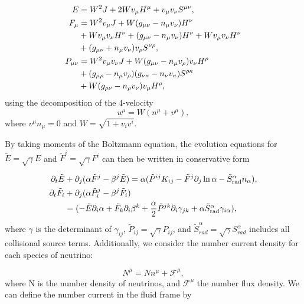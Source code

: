 \begin{align}
  E &= W^2 J + 2 W v_\mu H^\mu + v_\mu v_\nu S^{\mu\nu}, \\
  F_\mu &= W^2 v_\mu J + W(g_{\mu\nu} - n_\mu v_\nu) H^\nu \\
  &+ W v_\mu v_\nu H^\nu + (g_{\mu\nu} - n_\mu v_\nu) H^\nu + Wv_\mu v_\nu H^\nu \notag\\
  &+ (g_{\mu\nu} + n_\mu v_\nu) v_\rho S^{\nu\rho}, \notag\\
  P_{\mu\nu} &= W^2 v_\mu v_\nu J + W(g_{\mu\nu} - n_\mu v_\rho)v_\nu H^\rho \\
  &+ (g_{\mu\rho} - n_\mu v_\rho)(g_{\nu\kappa} - n_\nu v_\kappa)S^{\rho\kappa} \notag \\
  &+ W(g_{\rho\nu} - n_\rho v_\nu) v_\mu H^\rho, \notag
\end{align}
%
using the decomposition of the 4-velocity
%
\begin{equation}
  \label{eqn:vel_decomp}
  u^\mu = W(n^\mu + v^\mu),
\end{equation}
%
where $v^\mu n_\mu = 0$ and $W = \sqrt{1 + v_i v^i}$.

By taking moments of the Boltzmann equation, the evolution equations for $\tilde E = \sqrt{\gamma}E$ and $\tilde F^i = \sqrt{\gamma} F^i$ can then be written in conservative form

\begin{align}
  \partial_t \tilde E &+ \partial_j (\alpha \tilde F^j - \beta^j \tilde E) = \alpha(\tilde P^{ij} K_{ij} - \tilde F^j \partial_j \ln \alpha - \tilde S_\text{rad}^\alpha n_\alpha), \\
  \partial_t \tilde F_i &+ \partial_j (\alpha \tilde P_i^j - \beta^j \tilde F_i) \\
  &= (-\tilde{E} \partial_i \alpha + \tilde{F}_k \partial_i \beta^k + \frac{\alpha}{2} \tilde{P}^{jk} \partial_i \gamma_{jk} + \alpha \tilde{S}_{\text{rad}}^\alpha \gamma_{i\alpha}) \notag,
\end{align}
%
where $\gamma$ is the determinant of $\gamma_{ij}$, $\tilde{P}_{ij} = \sqrt{\gamma}P_{ij}$, and $\tilde{S}_{rad}^\alpha = \sqrt{\gamma} S_{rad}^\alpha$ includes all collisional source terms. Additionally, we consider the number current density for each species of neutrino:

\begin{equation}
  N^\mu = Nn^\mu + \mathcal{F}^\mu,
\end{equation}
%
where N is the number density of neutrinos, and $\mathcal{F}^\mu$ the number flux density. We can define the number current in the fluid frame by

